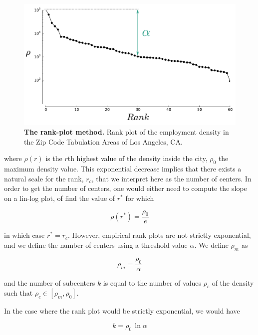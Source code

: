 \begin{figure}
    \centering
    \includegraphics[width=1\textwidth]{gfx/chapter-monocentric/rank_plot_LA.pdf}
    \caption{{\bf The rank-plot method.} Rank plot of the employment density in
        the Zip Code Tabulation Areas of Los Angeles, CA.
    \label{fig:rank_plot}}
\end{figure}

where $\rho(r)$ is the $r$th highest value of the density inside the city,
$\rho_0$ the maximum density value. This exponential decrease implies that there
exists a natural scale for the rank, $r_c$, that we interpret here as the number
of centers. In order to get the number of centers, one would either need to
compute the slope on a lin-log plot, of find the value of $r^*$ for which

\begin{equation}
    \rho(r^*) = \frac{\rho_0}{e} 
\end{equation}

in which case $r^*=r_c$. However, empirical rank plots are not strictly exponential,
and we define the number of centers using a threshold value $\alpha$. We define
$\rho_m$ as 

\begin{equation}
    \rho_m = \frac{\rho_0}{\alpha}
\end{equation}

and the number of subcenters $k$ is equal to the number of values $\rho_c$ of
the density such that $\rho_c \in \left[ \rho_m, \rho_0 \right]$. 

In the case where the rank plot would be strictly exponential, we would have

\begin{equation}
    k = \rho_0\,\ln \alpha
\end{equation}

